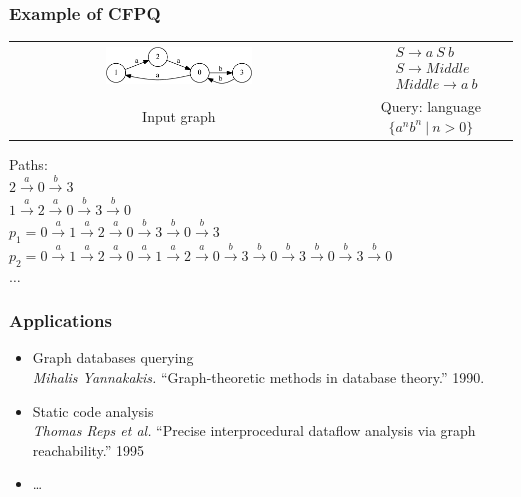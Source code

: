 \documentclass[xcolor=table]{beamer}
\begin{document}
\begin{frame} \frametitle{Example of CFPQ}

\begin{center}
  \begin{tabular}{  c  c  }
      \includegraphics[width=0.45\textwidth]{pictures/input.pdf}
      &
  $

  \begin{array}{rl}
     & S \rightarrow a \ S \ b \\
     & S \rightarrow Middle \\
     & Middle \rightarrow a \ b
  \end{array}

  $
  \\
  Input graph
  &
  Query: language $\{a^nb^n \ | \ n > 0 \}$

  \end{tabular}
\end{center}
\pause
\vspace{0.5cm}
Paths: \\
$2 \xrightarrow{a} 0 \xrightarrow{b} 3$ \\
$1 \xrightarrow{a} 2 \xrightarrow{a} 0 \xrightarrow{b} 3 \xrightarrow{b} 0$ \\
$p_1 = 0 \xrightarrow{a} 1 \xrightarrow{a} 2 \xrightarrow{a} 0 \xrightarrow{b} 3 \xrightarrow{b} 0 \xrightarrow{b} 3$ \\
$p_2 = 0 \xrightarrow{a} 1 \xrightarrow{a} 2 \xrightarrow{a} 0 \xrightarrow{a} 1 \xrightarrow{a} 2 \xrightarrow{a} 0 \xrightarrow{b} 3 \xrightarrow{b} 0 \xrightarrow{b} 3 \xrightarrow{b} 0 \xrightarrow{b} 3 \xrightarrow{b} 0$ \\
$\dots$

\end{frame}


\begin{frame} \frametitle{Applications}
\begin{itemize}
\item Graph databases querying \\
\emph{Mihalis Yannakakis.} ``Graph-theoretic methods in database theory.'' 1990.
\item Static code analysis \\
\emph{Thomas Reps et al.} ``Precise interprocedural dataflow analysis via graph reachability.'' 1995
\item \dots
\end{itemize}
\end{frame}
\end{document}
